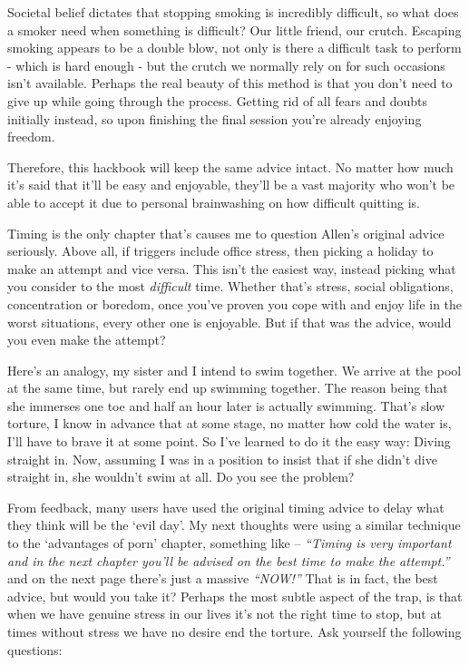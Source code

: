 \documentclass[
]{book}
\begin{document}
Societal belief dictates that stopping smoking is incredibly difficult, so what does a smoker need when something is difficult? Our little friend, our crutch. Escaping smoking appears to be a double blow, not only is there a difficult task to perform - which is hard enough - but the crutch we normally rely on for such occasions isn't available. Perhaps the real beauty of this method is that you don't need to give up while going through the process. Getting rid of all fears and doubts initially instead, so upon finishing the final session you're already enjoying freedom.

Therefore, this hackbook will keep the same advice intact. No matter how much it's said that it'll be easy and enjoyable, they'll be a vast majority who won't be able to accept it due to personal brainwashing on how difficult quitting is.

Timing is the only chapter that's causes me to question Allen's original advice seriously. Above all, if triggers include office stress, then picking a holiday to make an attempt and vice versa. This isn't the easiest way, instead picking what you consider to the most \emph{difficult} time. Whether that's stress, social obligations, concentration or boredom, once you've proven you cope with and enjoy life in the worst situations, every other one is enjoyable. But if that was the advice, would you even make the attempt?

Here's an analogy, my sister and I intend to swim together. We arrive at the pool at the same time, but rarely end up swimming together. The reason being that she immerses one toe and half an hour later is actually swimming. That's slow torture, I know in advance that at some stage, no matter how cold the water is, I'll have to brave it at some point. So I've learned to do it the easy way: Diving straight in. Now, assuming I was in a position to insist that if she didn't dive straight in, she wouldn't swim at all. Do you see the problem?

From feedback, many users have used the original timing advice to delay what they think will be the `evil day'. My next thoughts were using a similar technique to the `advantages of porn' chapter, something like -- \emph{``Timing is very important and in the next chapter you'll be advised on the best time to make the attempt.''} and on the next page there's just a massive \emph{``NOW!''} That is in fact, the best advice, but would you take it? Perhaps the most subtle aspect of the trap, is that when we have genuine stress in our lives it's not the right time to stop, but at times without stress we have no desire end the torture. Ask yourself the following questions:
\end{document}
